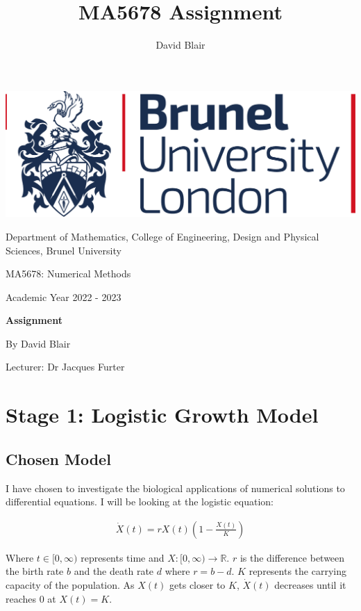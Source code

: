 \documentclass[]{article}
\title{MA5678 Assignment}
\author{David Blair}
\begin{document}
	\vspace*{\fill}
	\begin{center}
		\includegraphics[scale = 0.15]{images/brunel logo.png}
		
		\vspace{1cm}
		\Large{Department of Mathematics, College of Engineering, Design and Physical Sciences, Brunel University}
		
		\vspace{1cm}
		\Large{MA5678: Numerical Methods}
		
		\vspace{1cm}
		\large{Academic Year 2022 - 2023}
		
		\vspace{1.5cm}
		\LARGE{\bf Assignment}
		
		\vspace{1cm}
		\large{By David Blair}
		
		\vspace{0.1cm}
		\large{Lecturer: Dr Jacques Furter}
	\end{center}
	\vspace*{\fill}
	\newpage
	\section{Stage 1: Logistic Growth Model}
	\subsection{Chosen Model}
	I have chosen to investigate the biological applications of numerical solutions to differential equations. I will be looking at the logistic equation: 
	
	\begin{align}
		\dot X(t) = rX(t)\left(1 - \frac{X(t)}{K}\right)	
		\label{eq:logistic_growth}	
	\end{align}
	
	Where $t \in [0, \infty)$ represents time and $X: [0, \infty) \rightarrow \mathbb{R}$. $r$ is the difference between the birth rate $b$ and the death rate $d$ where $r = b - d$. 
	$K$ represents the carrying capacity of the population. As $X(t)$ gets closer to $K$, $\dot X(t)$ decreases until it reaches 0 at $X(t) = K$.
	
\end{document}
